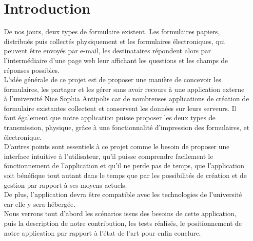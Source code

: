 \documentclass{sigplanconf}
\begin{document}
\section{Introduction}
De nos jours, deux types de formulaire existent. Les formulaires papiers, distribués puis collectés physiquement et les formulaires électroniques, qui peuvent être envoyés par e-mail, les destinataires répondent alors par l’intermédiaire d’une page web leur affichant les questions et les champs de réponses possibles.\\
L’idée générale de ce projet est de proposer une manière de concevoir les formulaires, les partager et les gérer sans avoir recours à une application externe à l’université Nice Sophia Antipolis car de nombreuses applications de création de formulaire existantes collectent et conservent les données sur leurs serveurs. Il faut également que notre application puisse proposer les deux types de transmission, physique, grâce à une fonctionnalité d’impression des formulaires, et électronique.\\
D’autres points sont essentiels à ce projet comme le besoin de proposer une interface intuitive à l’utilisateur, qu’il puisse comprendre facilement le fonctionnement de l’application et qu’il ne perde pas de temps, que l’application soit bénéfique tout autant dans le temps que par les possibilités de création et de gestion par rapport à ses moyens actuels. \\
De plus, l’application devra être compatible avec les technologies de l’université car elle y sera hébergée.\\

Nous verrons tout d'abord les scénarios issus des besoins de cette application, puis la description de notre contribution, les tests réalisés, le positionnement de notre application par rapport à l'état de l'art pour enfin conclure.


\end{document}

